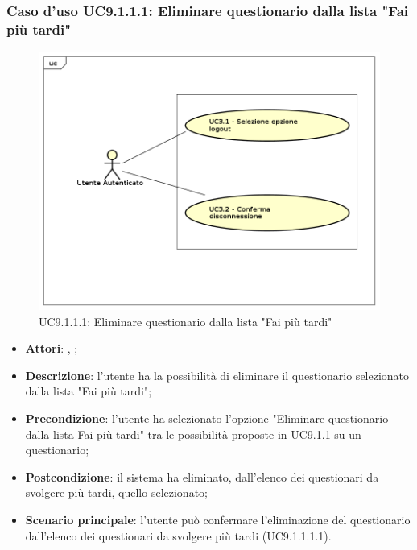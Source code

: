 				\subsubsection{Caso d'uso UC9.1.1.1: Eliminare questionario dalla lista "Fai più tardi"}
				\label{UC9.1.4.1}
				\begin{figure}[h]
					\centering
					\includegraphics[scale=0.5,keepaspectratio]{UML/UC9.png}
					\caption{UC9.1.1.1: Eliminare questionario dalla lista "Fai più tardi"}
				\end{figure}
				\FloatBarrier
				\begin{itemize}
					\item \textbf{Attori}: \uau, \uaupro;
					\item \textbf{Descrizione}: l'utente ha la possibilità di eliminare il questionario selezionato dalla lista "Fai più tardi";
					\item \textbf{Precondizione}: l'utente ha selezionato l'opzione "Eliminare questionario dalla lista Fai più tardi" tra le possibilità proposte in UC9.1.1 su un questionario;
					\item \textbf{Postcondizione}: il sistema ha eliminato, dall'elenco dei questionari da svolgere più tardi, quello selezionato;
					\item \textbf{Scenario principale}: l'utente può confermare l'eliminazione del questionario dall'elenco dei questionari da svolgere più tardi (UC9.1.1.1.1).	
				\end{itemize}
				
